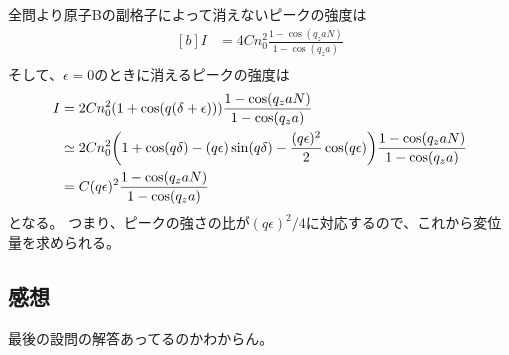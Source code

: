 \documentclass[../../sp_2017.tex]{subfiles}
\begin{document}
\subsection{}
全問より原子Bの副格子によって消えないピークの強度は
\begin{equation}\begin{aligned}[b]
    I &=4Cn_0^2\frac{1-\cos(q_zaN)}{1-\cos(q_za)}\\
\end{aligned}\end{equation}
そして、\(\epsilon=0\)のときに消えるピークの強度は
\begin{equation}\begin{aligned}[b]
    I &=2Cn_0^2(1+\cos(q(\delta+\epsilon)))\frac{1-\cos(q_zaN)}{1-\cos(q_za)}\\
    &\simeq 2Cn_0^2\qty(1+\cos(q\delta)-(q\epsilon)\sin(q\delta)-\frac{(q\epsilon)^2}{2}\cos(q\epsilon))\frac{1-\cos(q_zaN)}{1-\cos(q_za)}\\
    &=C(q\epsilon)^2\frac{1-\cos(q_zaN)}{1-\cos(q_za)}
\end{aligned}\end{equation}
となる。
つまり、ピークの強さの比が\((q\epsilon)^2/4\)に対応するので、これから変位量を求められる。


\subsection*{感想}
最後の設問の解答あってるのかわからん。
\end{document}
